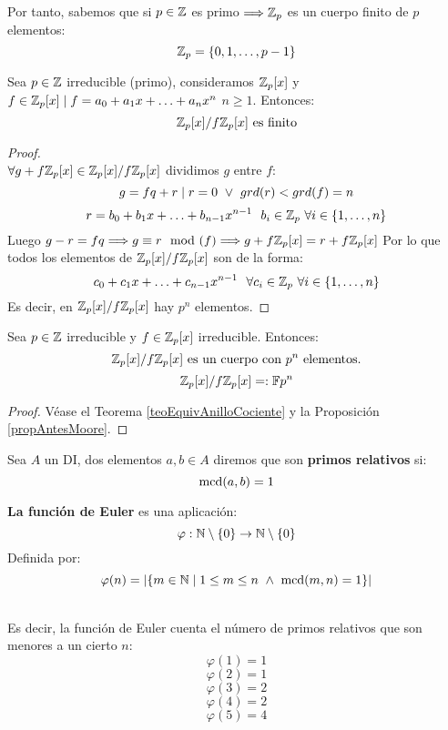 Por tanto, sabemos que si $p \in \mathbb Z$ es primo $\Longrightarrow \mathbb Z_p$ es un cuerpo finito de $p$ elementos:
$$\mathbb Z_p = \{0, 1, \ldots, p-1\}$$

\begin{prop}
    \label{propAntesMoore}
    Sea $p \in \mathbb Z$ irreducible (primo), consideramos $\mathbb Z_p[x]$ y $f \in \mathbb Z_p[x] \mid f = a_0 + a_1x + \ldots + a_nx^n$ $n\geq1$.
    Entonces:
    $$\mathbb Z_p[x]/f\mathbb Z_p[x]\mbox{ es finito}$$
\begin{proof}
    \ \\
    $\forall g+f\mathbb Z_p[x] \in \mathbb Z_p[x]/f\mathbb Z_p[x]$ dividimos $g$ entre $f$:
    $$g=fq+r \mid r=0 \ \lor \  grd(r)<grd(f)=n$$
    $$r=b_0+b_1x+\ldots+b_{n-1}x^{n-1}~~b_i \in \mathbb Z_p ~\forall i \in \{1, \ldots, n\}$$
    Luego $g-r=fq \Longrightarrow g\equiv r\mod(f) \Longrightarrow g+f\mathbb Z_p[x] = r+f\mathbb Z_p[x]$\newline
    Por lo que todos los elementos de $\mathbb Z_p[x]/f\mathbb Z_p[x]$ son de la forma:
    $$c_0 + c_1x + \ldots + c_{n-1}x^{n-1}~~\forall c_i \in \mathbb Z_p~\forall i \in \{1, \ldots, n\}$$
    Es decir, en $\mathbb Z_p[x]/f\mathbb Z_p[x]$ hay $p^n$ elementos.
\end{proof}
\end{prop}

\begin{teo}
    Sea $p \in \mathbb Z$ irreducible y $f \in \mathbb Z_p[x]$ irreducible. Entonces:
    $$\mathbb Z_p[x]/f\mathbb Z_p[x] \mbox{ es un cuerpo con } p^n \mbox{ elementos.}$$
    $$\mathbb Z_p[x]/f\mathbb Z_p[x] =: \mathbb{F}p^n$$
\begin{proof}
    Véase el Teorema \ref{teoEquivAnilloCociente} y la Proposición \ref{propAntesMoore}.
\end{proof}
\end{teo}

\begin{definicion}
    Sea $A$ un DI, dos elementos $a,b\in A$ diremos que son \textbf{primos relativos} si:
    $$\operatorname{mcd}(a,b) = 1$$
\end{definicion}

\begin{definicion}
    \textbf{La función de Euler} es una aplicación:
    $$\varphi:\mathbb N\setminus\{0\}\rightarrow\mathbb N\setminus\{0\}$$
    Definida por:
    $$\varphi(n) = |\{m \in \mathbb N \mid 1\leq m\leq n \ \land \  \operatorname{mcd}(m,n)=1\}|$$
\end{definicion}~\\

Es decir, la función de Euler cuenta el número de primos relativos que son menores a un cierto $n$:
$$\varphi(1)=1$$
$$\varphi(2)=1$$
$$\varphi(3)=2$$
$$\varphi(4)=2$$
$$\varphi(5)=4$$

